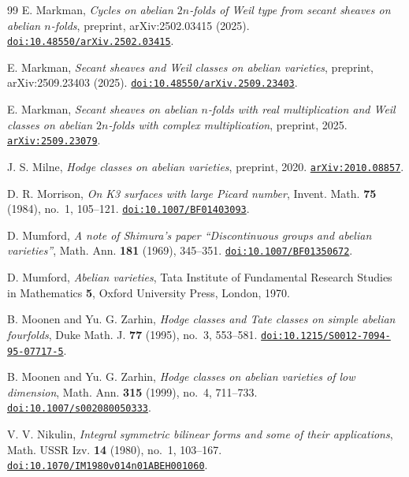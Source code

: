 \begin{thebibliography}{99}
E. Markman,
\emph{Cycles on abelian $2n$-folds of Weil type from secant sheaves on abelian
$n$-folds}, preprint, arXiv:2502.03415 (2025).
\href{https://doi.org/10.48550/arXiv.2502.03415}{\nolinkurl{doi:10.48550/arXiv.2502.03415}}.

E. Markman,
\emph{Secant sheaves and Weil classes on abelian varieties},
preprint, arXiv:2509.23403 (2025).
\href{https://doi.org/10.48550/arXiv.2509.23403}{\nolinkurl{doi:10.48550/arXiv.2509.23403}}.

E. Markman,
\emph{Secant sheaves on abelian $n$-folds with real multiplication and Weil
classes on abelian $2n$-folds with complex multiplication},
preprint, 2025.
\href{https://arxiv.org/abs/2509.23079}{\nolinkurl{arXiv:2509.23079}}.

J. S. Milne,
\emph{Hodge classes on abelian varieties},
preprint, 2020.
\href{https://arxiv.org/abs/2010.08857}{\nolinkurl{arXiv:2010.08857}}.

D. R. Morrison,
\emph{On K3 surfaces with large Picard number},
Invent. Math. \textbf{75} (1984), no.~1, 105--121.
\href{https://doi.org/10.1007/BF01403093}{\nolinkurl{doi:10.1007/BF01403093}}.

D. Mumford,
\emph{A note of Shimura's paper ``Discontinuous groups and abelian
varieties''},
Math. Ann. \textbf{181} (1969), 345--351.
\href{https://doi.org/10.1007/BF01350672}{\nolinkurl{doi:10.1007/BF01350672}}.

D. Mumford,
\emph{Abelian varieties},
Tata Institute of Fundamental Research Studies in Mathematics \textbf{5}, Oxford University Press, London, 1970.

B. Moonen and Yu. G. Zarhin,
\emph{Hodge classes and Tate classes on simple abelian fourfolds},
Duke Math. J. \textbf{77} (1995), no.~3, 553--581.
\href{https://doi.org/10.1215/S0012-7094-95-07717-5}{\nolinkurl{doi:10.1215/S0012-7094-95-07717-5}}.

B. Moonen and Yu. G. Zarhin,
\emph{Hodge classes on abelian varieties of low dimension},
Math. Ann. \textbf{315} (1999), no.~4, 711--733.
\href{https://doi.org/10.1007/s002080050333}{\nolinkurl{doi:10.1007/s002080050333}}.

V. V. Nikulin,
\emph{Integral symmetric bilinear forms and some of their applications},
Math. USSR Izv. \textbf{14} (1980), no.~1, 103--167.
\href{https://doi.org/10.1070/IM1980v014n01ABEH001060}{\nolinkurl{doi:10.1070/IM1980v014n01ABEH001060}}.


\end{thebibliography}
